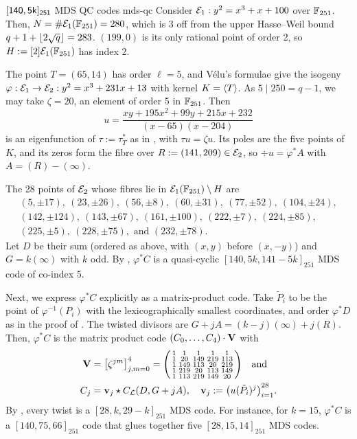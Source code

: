 \documentclass[twocolumn, 11pt]{scrartcl}
\begin{document}
\begin{example}{$\sf{[140,5k]_{251}}$ MDS\hspace{-1pt} QC\hspace{-1pt} codes \cite{code-f251}}{mds-qc}
Consider $\mcE_1:y^2=x^3+x+100$ over $\bbF_{251}$. Then, $N=\#\mcE_1(\bbF_{251})=280$, which is 3 off from the upper Hasse--Weil bound $q+1+\floor{2\sqrt q}=283$. $(199,0)$ is its only rational point of order 2, so $H:=[2]\mcE_1(\bbF_{251})$ has index 2.

The point $T=(65,14)$ has order $\ell=5$, and V\'elu's formulae give the isogeny $\varphi:\mcE_1\to\mcE_2:y^2=x^3+231x+13$ with kernel $K=\ang T$. As $5\mid250=q-1$, we may take $\zeta=20$, an element of order 5 in $\bbF_{251}$. Then
\[ u=\frac{xy+195x^2+99y+215x+232}{(x-65)(x-204)} \]
is an eigenfunction of $\tau:=\tau_T^*$ as in , with $\tau u=\zeta u$. Its poles are the five points of $K$, and its zeros form the fibre over $R:=(141,209)\in\mcE_2$, so $\div u=\varphi^*A$ with $A=(R)-(\infty)$.

The 28 points of $\mcE_2$ whose fibres lie in $\mcE_1(\bbF_{251})\setminus H$ are
\[ \begin{gathered}
\scriptstyle (5,\pm17),\ (23,\pm26),\ (56,\pm8),\ (60,\pm31),\ (77,\pm52),\ (104,\pm24),\\[-6pt]
\scriptstyle (142,\pm124),\ (143,\pm67),\ (161,\pm100),\ (222,\pm7),\ (224,\pm85),\\[-6pt]
\scriptstyle (225,\pm5),\ (228,\pm75),\text{ and } (232,\pm78).
\end{gathered} \]
Let $D$ be their sum (ordered as above, with $(x,y)$ before $(x,-y)$) and $G=k(\infty)$ with $k$ odd. By , $\varphi^*C$ is a quasi-cyclic $[140,5k,141-5k]_{251}$ MDS code of co-index 5.

Next, we express $\varphi^*C$ explicitly as a matrix-product code. Take $\tilde P_i$ to be the point of $\varphi^{-1}(P_i)$ with the lexicographically smallest coordinates, and order $\varphi^*D$ as in the proof of . The twisted divisors are $G+jA=(k-j)(\infty)+j(R)$. Then, $\varphi^*C$ is the matrix product code $(C_0,\hdots,C_4)\cdot\bfV$ with
\begin{align*}
    \bfV&=\br*{\zeta^{jm}}_{j,m=0}^4=\begin{psmallmatrix}
1&1&1&1&1 \\
1&20&149&219&113 \\
1&149&113&20&219 \\
1&219&20&113&149 \\
1&113&219&149&20
\end{psmallmatrix}\quad\text{and} \\
C_j&=\bfv_j\star C_\mcL(D,G+jA),\quad \bfv_j:=\pa*{u(\tilde P_i)^j}_{i=1}^{28}.
\end{align*}
By , every twist is a $[28,k,29-k]_{251}$ MDS code. For instance, for $k=15$, $\varphi^*C$ is a $[140,75,66]_{251}$ code that glues together five $[28,15,14]_{251}$ MDS codes.


\end{example}
\end{document}
